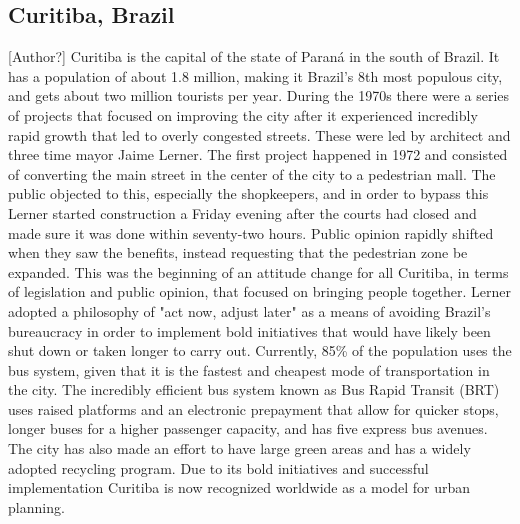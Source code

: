 \documentclass[12pt]{article}                         %
\begin{document}
\subsection{Curitiba, Brazil}[Author?]
Curitiba is the capital of the state of Paraná in the south of Brazil. It has a population of about 1.8 million, making it Brazil’s 8th most populous city, and gets about two million tourists per year. During the 1970s there were a series of projects that focused on improving the city after it experienced incredibly rapid growth that led to overly congested streets. These were led by architect and three time mayor Jaime Lerner. The first project happened in 1972 and consisted of converting the main street in the center of the city to a pedestrian mall. The public objected to this, especially the shopkeepers, and in order to bypass this Lerner started construction a Friday evening after the courts had closed and made sure it was done within seventy-two hours. Public opinion rapidly shifted when they saw the benefits, instead requesting that the pedestrian zone be expanded. This was the beginning of an attitude change for all Curitiba, in terms of legislation and public opinion, that focused on bringing people together. Lerner adopted a philosophy of "act now, adjust later" as a means of avoiding Brazil’s bureaucracy in order to implement bold initiatives that would have likely been shut down or taken longer to carry out. Currently, 85\% of the population uses the bus system, given that it is the fastest and cheapest mode of transportation in the city. The incredibly efficient bus system known as Bus Rapid Transit (BRT) uses raised platforms and an electronic prepayment that allow for quicker stops, longer buses for a higher passenger capacity, and has five express bus avenues. The city has also made an effort to have large green areas and has a widely adopted recycling program. Due to its bold initiatives and successful implementation Curitiba is now recognized worldwide as a model for urban planning. 
\end{document}
